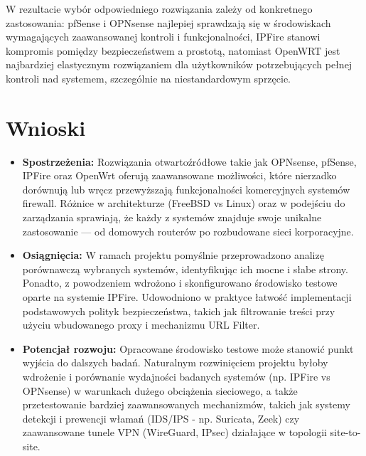 \documentclass[12pt,a4paper]{article}
\begin{document}
W rezultacie wybór odpowiedniego rozwiązania zależy od konkretnego zastosowania: pfSense i OPNsense najlepiej sprawdzają się w środowiskach wymagających zaawansowanej kontroli i funkcjonalności, IPFire stanowi kompromis pomiędzy bezpieczeństwem a prostotą, natomiast OpenWRT jest najbardziej elastycznym rozwiązaniem dla użytkowników potrzebujących pełnej kontroli nad systemem, szczególnie na niestandardowym sprzęcie.



\newpage
\section{Wnioski}
\begin{itemize}
    \item \textbf{Spostrzeżenia:} Rozwiązania otwartoźródłowe takie jak OPNsense, pfSense, IPFire oraz OpenWrt oferują zaawansowane możliwości, które nierzadko dorównują lub wręcz przewyższają funkcjonalności komercyjnych systemów firewall. Różnice w architekturze (FreeBSD vs Linux) oraz w podejściu do zarządzania sprawiają, że każdy z systemów znajduje swoje unikalne zastosowanie --- od domowych routerów po rozbudowane sieci korporacyjne.
    \item \textbf{Osiągnięcia:} W ramach projektu pomyślnie przeprowadzono analizę porównawczą wybranych systemów, identyfikując ich mocne i słabe strony. Ponadto, z powodzeniem wdrożono i skonfigurowano środowisko testowe oparte na systemie IPFire. Udowodniono w praktyce łatwość implementacji podstawowych polityk bezpieczeństwa, takich jak filtrowanie treści przy użyciu wbudowanego proxy i mechanizmu URL Filter.
    \item \textbf{Potencjał rozwoju:} Opracowane środowisko testowe może stanowić punkt wyjścia do dalszych badań. Naturalnym rozwinięciem projektu byłoby wdrożenie i porównanie wydajności badanych systemów (np. IPFire vs OPNsense) w warunkach dużego obciążenia sieciowego, a także przetestowanie bardziej zaawansowanych mechanizmów, takich jak systemy detekcji i prewencji włamań (IDS/IPS - np. Suricata, Zeek) czy zaawansowane tunele VPN (WireGuard, IPsec) działające w topologii site-to-site.
\end{itemize}





\newpage
\end{document}
